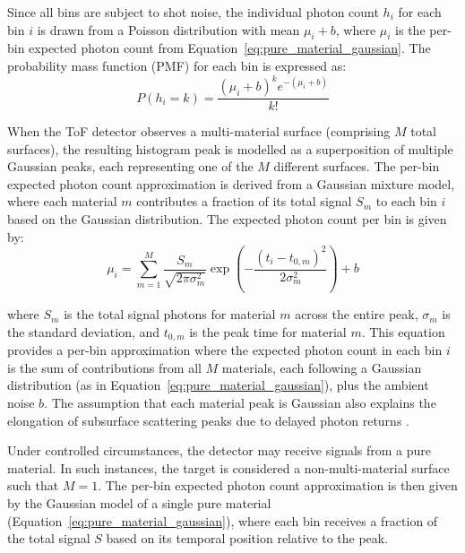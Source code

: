\documentclass[12pt,a4paper,oneside]{report}
\begin{document}
Since all bins are subject to shot noise, the individual photon count $h_i$ for each bin $i$ is drawn from a Poisson distribution with mean $\mu_i + b$, where $\mu_i$ is the per-bin expected photon count from Equation~\ref{eq:pure_material_gaussian}. The probability mass function (PMF) for each bin is expressed as:
\begin{equation}
P(h_i = k) = \frac{(\mu_i + b)^k e^{-(\mu_i + b)}}{k!}
\label{eq:poisson_pmf}
\end{equation}

When the ToF detector observes a multi-material surface (comprising $M$ total surfaces), the resulting histogram peak is modelled as a superposition of multiple Gaussian peaks, each representing one of the $M$ different surfaces. The per-bin expected photon count approximation is derived from a Gaussian mixture model, where each material $m$ contributes a fraction of its total signal $S_m$ to each bin $i$ based on the Gaussian distribution. The expected photon count per bin is given by:
\begin{equation}
\mu_i = \sum_{m=1}^{M} \frac{S_m}{\sqrt{2\pi\sigma_m^2}} \exp\left(-\frac{(t_i - t_{0,m})^2}{2\sigma_m^2}\right) + b
\label{eq:gaussian_mixture}
\end{equation}

where $S_m$ is the total signal photons for material $m$ across the entire peak, $\sigma_m$ is the standard deviation, and $t_{0,m}$ is the peak time for material $m$. This equation provides a per-bin approximation where the expected photon count in each bin $i$ is the sum of contributions from all $M$ materials, each following a Gaussian distribution (as in Equation~\ref{eq:pure_material_gaussian}), plus the ambient noise $b$. The assumption that each material peak is Gaussian also explains the elongation of subsurface scattering peaks due to delayed photon returns \cite{koerner2021,su2016}.

Under controlled circumstances, the detector may receive signals from a pure material. In such instances, the target is considered a non-multi-material surface such that $M = 1$. The per-bin expected photon count approximation is then given by the Gaussian model of a single pure material (Equation~\ref{eq:pure_material_gaussian}), where each bin receives a fraction of the total signal $S$ based on its temporal position relative to the peak.
\end{document}
